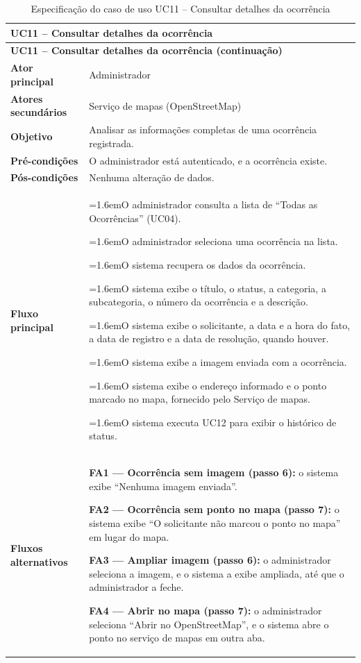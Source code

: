 \documentclass[12pt,a4paper]{article}
\newcommand{\ucitem}[2]{\par\noindent\hangindent=1.6em\hangafter=1\makebox[1.6em][l]{#1}#2}
\begin{document}
\begin{longtable}{|p{}|p{}|}
\caption{Especificação do caso de uso UC11 -- Consultar detalhes da ocorrência}
\label{tab:uc11} \\
\hline
\multicolumn{2}{|l|}{\textbf{UC11 -- Consultar detalhes da ocorrência}} \\
\hline
\endfirsthead

\hline
\multicolumn{2}{|l|}{\textbf{UC11 -- Consultar detalhes da ocorrência (continuação)}} \\
\hline
\endhead

\hline
\endfoot
\textbf{Ator principal} & Administrador \\ \hline
\textbf{Atores secundários} & Serviço de mapas (OpenStreetMap) \\ \hline
\textbf{Objetivo} & Analisar as informações completas de uma ocorrência registrada. \\ \hline
\textbf{Pré-condições} & O administrador está autenticado, e a ocorrência existe. \\ \hline
\textbf{Pós-condições} & Nenhuma alteração de dados. \\ \hline
\textbf{Fluxo principal} &
\ucitem{1.}{O administrador consulta a lista de ``Todas as Ocorrências'' (UC04).}
\ucitem{2.}{O administrador seleciona uma ocorrência na lista.}
\ucitem{3.}{O sistema recupera os dados da ocorrência.}
\ucitem{4.}{O sistema exibe o título, o status, a categoria, a subcategoria, o número da ocorrência e a descrição.}
\ucitem{5.}{O sistema exibe o solicitante, a data e a hora do fato, a data de registro e a data de resolução, quando houver.}
\ucitem{6.}{O sistema exibe a imagem enviada com a ocorrência.}
\ucitem{7.}{O sistema exibe o endereço informado e o ponto marcado no mapa, fornecido pelo Serviço de mapas.}
\ucitem{8.}{O sistema executa UC12 para exibir o histórico de status.} \\ \hline
\textbf{Fluxos alternativos} &
\noindent \textbf{FA1 — Ocorrência sem imagem (passo 6):} o sistema exibe ``Nenhuma imagem enviada''.
\par\smallskip\noindent \textbf{FA2 — Ocorrência sem ponto no mapa (passo 7):} o sistema exibe ``O solicitante não marcou o ponto no mapa'' em lugar do mapa.
\par\smallskip\noindent \textbf{FA3 — Ampliar imagem (passo 6):} o administrador seleciona a imagem, e o sistema a exibe ampliada, até que o administrador a feche.
\par\smallskip\noindent \textbf{FA4 — Abrir no mapa (passo 7):} o administrador seleciona ``Abrir no OpenStreetMap'', e o sistema abre o ponto no serviço de mapas em outra aba.

\end{longtable}
\end{document}
